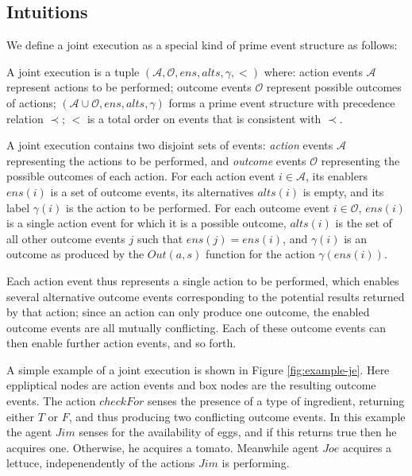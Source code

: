 \subsection{Intuitions}

We define a joint execution as a special kind of prime event structure
as follows:

\begin{defnL}
 A joint execution is a tuple $(\mathcal{A},\mathcal{O},ens,alts,\gamma,<)$
where: action events $\mathcal{A}$ represent actions to be performed;
outcome events $\mathcal{O}$ represent possible outcomes of actions;
$(\mathcal{A}\cup\mathcal{O},ens,alts,\gamma)$ forms a prime event
structure with precedence relation $\prec$; $<$ is a total order
on events that is consistent with $\prec$. 
\end{defnL}
A joint execution contains two disjoint sets of events: \emph{action}
events $\mathcal{A}$ representing the actions to be performed, and
\emph{outcome} events $\mathcal{O}$ representing the possible outcomes
of each action. For each action event $i\in\mathcal{A}$, its enablers
$ens(i)$ is a set of outcome events, its alternatives $alts(i)$
is empty, and its label $\gamma(i)$ is the action to be performed.
For each outcome event $i\in\mathcal{O}$, $ens(i)$ is a single action
event for which it is a possible outcome, $alts(i)$ is the set of
all other outcome events $j$ such that $ens(j)=ens(i)$, and $\gamma(i)$
is an outcome as produced by the $Out(a,s)$ function for the action
$\gamma(ens(i))$.

Each action event thus represents a single action to be performed,
which enables several alternative outcome events corresponding to
the potential results returned by that action; since an action can
only produce one outcome, the enabled outcome events are all mutually
conflicting. Each of these outcome events can then enable further
action events, and so forth.

A simple example of a joint execution is shown in Figure \ref{fig:example-je}.
Here eppliptical nodes are action events and box nodes are the resulting
outcome events. The action $checkFor$ senses the presence of a type
of ingredient, returning either $T$ or $F$, and thus producing two
conflicting outcome events. In this example the agent $Jim$ senses
for the availability of eggs, and if this returns true then he acquires
one. Otherwise, he acquires a tomato. Meanwhile agent $Joe$ acquires
a lettuce, indepenendently of the actions $Jim$ is performing.

